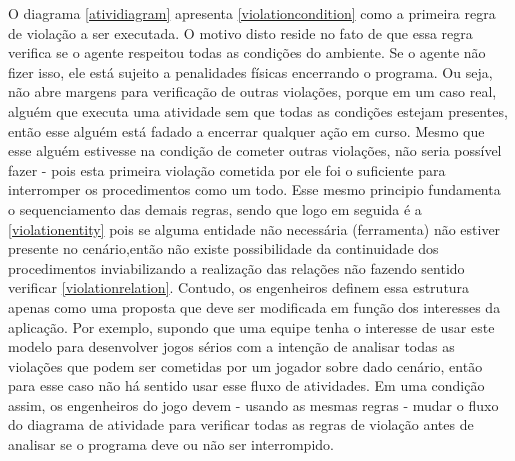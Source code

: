 O diagrama \ref{atividiagram} apresenta \ref{violationcondition} como a primeira regra de violação a ser executada. O motivo disto reside no fato de que essa regra verifica se o agente respeitou todas as condições do ambiente. Se o agente não fizer isso, ele está sujeito a penalidades físicas encerrando o programa. Ou seja, não abre margens para verificação de outras violações, porque em um caso real, alguém que executa uma atividade sem que todas as condições estejam presentes, então esse alguém está fadado a encerrar qualquer ação em curso. Mesmo que esse alguém estivesse na condição de cometer outras violações, não seria possível fazer - pois esta primeira violação cometida por ele foi o suficiente para interromper os procedimentos como um todo. Esse mesmo principio fundamenta o sequenciamento das demais regras, sendo que logo em seguida é a \ref{violationentity} pois se alguma entidade não necessária (ferramenta) não estiver presente no cenário,então não existe possibilidade da continuidade dos procedimentos inviabilizando a realização das relações não fazendo sentido verificar \ref{violationrelation}. Contudo, os engenheiros definem essa estrutura apenas como uma proposta que deve ser modificada em função dos interesses da aplicação. Por exemplo, supondo que uma equipe tenha o interesse de usar este modelo para desenvolver jogos sérios com a intenção de analisar todas as violações que podem ser cometidas por um jogador sobre dado cenário, então para esse caso não há sentido usar esse fluxo de atividades. Em uma condição assim, os engenheiros do jogo devem - usando as mesmas regras - mudar o fluxo do diagrama de atividade para verificar todas as regras de violação antes de analisar se o programa deve ou não ser interrompido.